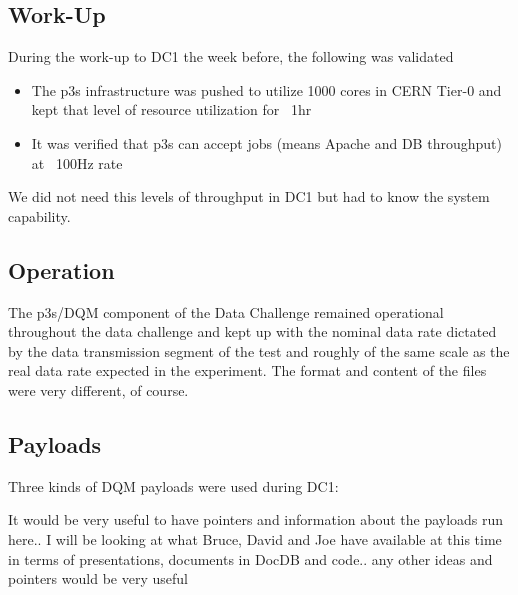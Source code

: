 \documentclass[pdftex,12pt,letter]{article}
\begin{document}
\subsection{Work-Up}

During the work-up to DC1 the week before, the following was validated
\begin{itemize}
\item The p3s infrastructure was pushed to utilize 1000 cores in CERN Tier-0 and kept that level of resource utilization for ~1hr
\item It was verified that p3s can accept jobs (means Apache and DB throughput) at ~100Hz rate
\end{itemize}
\noindent We did not need this levels of throughput in DC1 but had to know the system capability.

\subsection{Operation}
The p3s/DQM component of the Data Challenge remained operational throughout the data challenge  and kept up with the nominal data rate dictated by the data transmission segment of the test and roughly of the same scale as the real data rate expected in the experiment. The format and content of the files were very different, of course.
\subsection{Payloads}
Three kinds of DQM payloads were used during DC1:

 \color{red} It would be very useful to have pointers and information about the payloads run here.. I will be looking at what Bruce, David and Joe have available at this time in terms of presentations, documents in DocDB and code.. any other ideas and  pointers would be very useful
 \color {black}
 
\end{document}
